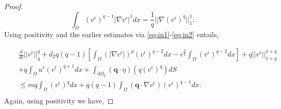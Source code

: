 \documentclass[10pt]{amsart}
\theoremstyle{plain}
\theoremstyle{definition}
\begin{document}
\begin{proof}
\begin{equation}
\int_{\Omega} (v^{\epsilon})^{q-1}|\nabla v^{\epsilon}|^{1}dx = \frac{1}{q}||\nabla (v^{\epsilon})^{q}||^{1}_{1}.
\end{equation}
%
Using positivity and the earlier estimates via \eqref{eq:in1}-\eqref{eq:in2} entails,




\begin{eqnarray}
&& \frac{d}{dt}||v^{\epsilon}||^{q}_{q}  + d_{2}  q(q-1)[\int_{\Omega} \left(
|\nabla v^{\epsilon}|\right)^{p}(v^{\epsilon})^{q-2} dx - \epsilon^{\frac{p}{2}}\int_{\Omega} (v^{\epsilon})^{q-2} dx]
+q||v^{\epsilon}||^{1+q}_{1+q} \nonumber \\
&& + q\int_{\Omega}  u^{\epsilon}(v^{\epsilon})^{q+1}dx 
+\int_{\partial \Omega_{2}} (\textbf{q}  \cdot \eta) (q(v^{\epsilon})^{q}) dS 
 \nonumber \\
&& 
\leq mq\int_{\Omega} (v^{\epsilon})^{q}dx + q(q-1)\int_{\Omega} (\textbf{q}\cdot \nabla v^{\epsilon}) (v^{\epsilon})^{q-1}dx.\nonumber \\
\end{eqnarray}
%
Again, using positivity we have,


\end{proof}
\end{document}
